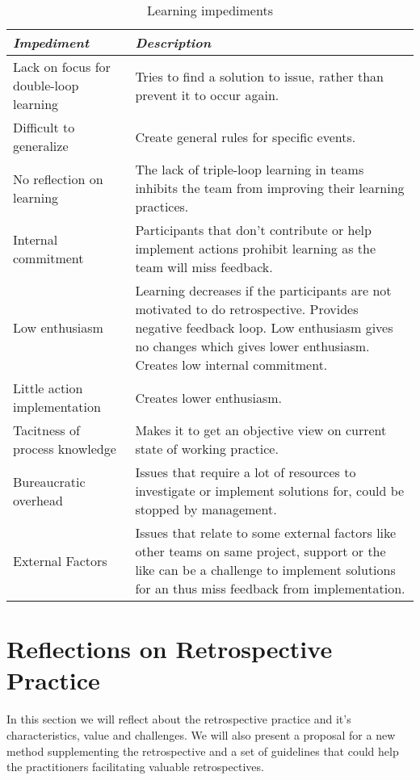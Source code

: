 \begin{table}[h]
	\begin{center}
		\caption{Learning impediments}
		\label{table:learning-impediments}
		\begin{tabular}{p{} p{}}
			\hline
			\textit{Impediment} & \textit{Description} \\
			\hline
			Lack on focus for double-loop learning & Tries to find a solution to issue, rather than prevent it to occur again. \\
			Difficult to generalize & Create general rules for specific events. \\
			No reflection on learning & The lack of triple-loop learning in teams inhibits the team from improving their learning practices. \\
			Internal commitment & Participants that don't contribute or help implement actions prohibit learning as the team will miss feedback. \\ 
			Low enthusiasm & Learning decreases if the participants are not motivated to do retrospective. Provides negative feedback loop. Low enthusiasm gives no changes which gives lower enthusiasm. Creates low internal commitment. \\
			Little action implementation & Creates lower enthusiasm. \\
			Tacitness of process knowledge & Makes it to get an objective view on current state of working practice. \\
			Bureaucratic overhead & Issues that require a lot of resources to investigate or implement solutions for, could be stopped by management. \\
			External Factors & Issues that relate to some external factors like other teams on same project, support or the like can be a challenge to implement solutions for an thus miss feedback from implementation.\\
			\hline
		\end{tabular}
	\end{center}
\end{table}

\clearpage

\section{Reflections on Retrospective Practice}
In this section we will reflect about the retrospective practice and it's characteristics, value and challenges. We will also present a proposal for a new method supplementing the retrospective and a set of guidelines that could help the practitioners facilitating valuable retrospectives. 

